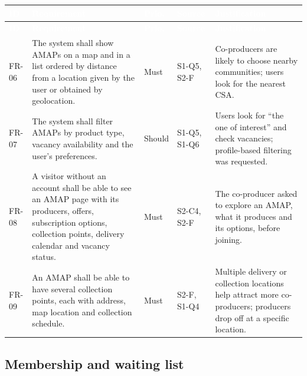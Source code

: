 \documentclass[11pt,a4paper]{article}
\begin{document}
{\footnotesize
\begin{longtable}{>{\raggedright\arraybackslash\hspace{0pt}}p{}>{\raggedright\arraybackslash\hspace{0pt}}p{}>{\raggedright\arraybackslash\hspace{0pt}}p{}>{\raggedright\arraybackslash\hspace{0pt}}p{}>{\raggedright\arraybackslash\hspace{0pt}}p{}}
\rowcolor{hdr}\textcolor{white}{\textbf{ID}} & \textcolor{white}{\textbf{Requirement}} & \textcolor{white}{\textbf{Prio.}} & \textcolor{white}{\textbf{Source}} & \textcolor{white}{\textbf{Justification}} \\ \endfirsthead
\rowcolor{hdr}\textcolor{white}{\textbf{ID}} & \textcolor{white}{\textbf{Requirement}} & \textcolor{white}{\textbf{Prio.}} & \textcolor{white}{\textbf{Source}} & \textcolor{white}{\textbf{Justification}} \\ \endhead
FR-06 & The system shall show AMAPs on a map and in a list ordered by distance from a location given by the user or obtained by geolocation. & Must & S1-Q5, S2-F & Co-producers are likely to choose nearby communities; users look for the nearest CSA. \\ \hline
FR-07 & The system shall filter AMAPs by product type, vacancy availability and the user's preferences. & Should & S1-Q5, S1-Q6 & Users look for ``the one of interest'' and check vacancies; profile-based filtering was requested. \\ \hline
FR-08 & A visitor without an account shall be able to see an AMAP page with its producers, offers, subscription options, collection points, delivery calendar and vacancy status. & Must & S2-C4, S2-F & The co-producer asked to explore an AMAP, what it produces and its options, before joining. \\ \hline
FR-09 & An AMAP shall be able to have several collection points, each with address, map location and collection schedule. & Must & S2-F, S1-Q4 & Multiple delivery or collection locations help attract more co-producers; producers drop off at a specific location. \\ \hline
\end{longtable}}
\addtocounter{table}{-1}

\subsection{Membership and waiting list}
\end{document}
